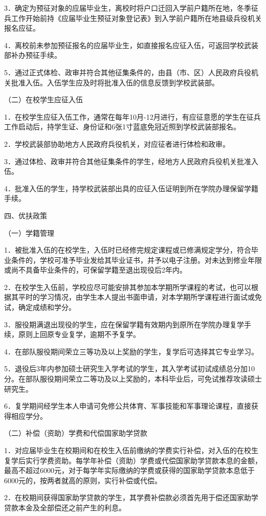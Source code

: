 \documentclass[UTF8,12pt,a4paper]{report}
\begin{document}
3．确定为预征对象的应届毕业生，离校时将户口迁回入学前户籍所在地，冬季征兵工作开始前持《应届毕业生预征对象登记表》到入学前户籍所在地县级兵役机关报名应征。

4．离校前未参加预征报名的应届毕业生，如直接报名应征入伍，可返回学校武装部补办预征手续。

5．通过正式体检、政审并符合其他征集条件的，由县（市、区）人民政府兵役机关批准入伍。入伍学生应及时将批准入伍的信息反馈到学校武装部。

（二）在校学生应征入伍

1．在校学生应征入伍工作，通常在每年10月-12月进行，有应征意愿的学生在征兵工作启动后，持学生证、身份证和6张1寸蓝底免冠近照到学校武装部报名。

2．学校武装部协助地方人民政府兵役机关，对应征者进行体检和政审。

3．通过体检、政审并符合其他征集条件的学生，经地方人民政府兵役机关批准入伍。

4．批准入伍的学生，持学校武装部出具的应征入伍证明到所在学院办理保留学籍手续。

四、优扶政策

（一）学籍管理

1．被批准入伍的在校学生，入伍时已经修完规定课程或已修满规定学分，符合毕业条件的，学校可准予毕业发给其毕业证书，并予以电子注册。对未达到修业年限或尚不具备毕业条件的，可保留学籍至退出现役后2年内。

2．在校学生入伍前，学校应尽可能安排其参加本学期所学课程的考试，也可以根据其平时的学习情况，由学生本人提出书面申请，对本学期所学课程进行面试或免试，确定成绩和学分。

3．服役期满退出现役的学生，应在保留学籍有效期内到原所在学院办理复学手续，原则上回原专业复学，逾期不予复学。

4．在部队服役期间荣立三等功及以上奖励的学生，复学后可选择其它专业学习。

5．退役后3年内参加硕士研究生入学考试的学生，其入学考试初试成绩总分加10分。在部队服役期间荣立二等功及以上奖励的，本科毕业后，可免试推荐攻读硕士研究生。

6．复学期间经学生本人申请可免修公共体育、军事技能和军事理论课程，直接获得相应学分。

（二）补偿（资助）学费和代偿国家助学贷款

1．对应届毕业生在校期间和在校生入伍前缴纳的学费实行补偿，对入伍的在校生复学后实行学费资助。每学年补偿（资助）学费或代偿国家助学贷款本息的金额，最高不超过6000元，对于每学年实际缴纳的学费或获得的国家助学贷款本息低于6000元的，按两者就高的原则，实行补偿或代偿。

2．在校期间获得国家助学贷款的学生，其学费补偿款必须首先用于偿还国家助学贷款本金及全部偿还之前产生的利息。
\end{document}
